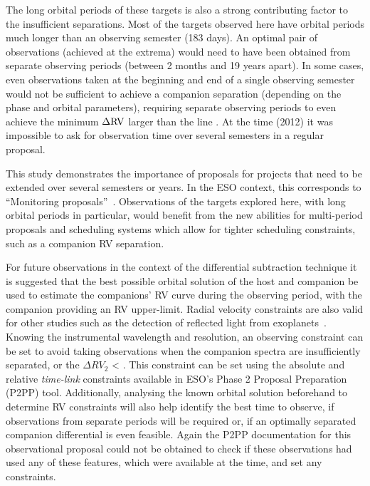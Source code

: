 The long orbital periods of these targets is also a strong contributing factor to the insufficient separations.
Most of the targets observed here have orbital periods much longer than an observing semester (183 days).
An optimal pair of observations (achieved at the extrema) would need to have been obtained from separate observing periods (between 2 months and 19 years apart).
In some cases, even observations taken at the beginning and end of a single observing semester would not be sufficient to achieve a companion separation (depending on the phase and orbital parameters), requiring separate observing periods to even achieve the minimum \(\Delta \rm {RV}\) larger than the line {\fwhm}.
At the time (2012) it was impossible to ask for observation time over several semesters in a regular proposal.

This study demonstrates the importance of proposals for projects that need to be extended over several semesters or years.
In the {ESO} context, this corresponds to ``Monitoring proposals''~\citep[e.g.][pg.~18]{eso_eso_2017}.
Observations of the targets explored here, with long orbital periods in particular, would benefit from the new abilities for multi-period proposals and scheduling systems which allow for tighter scheduling constraints, such as a companion {RV} separation.

For future observations in the context of the differential subtraction technique it is suggested that the best possible orbital solution of the host and companion be used to estimate the companions' {RV} curve during the observing period, with the companion \Mtwosini{} providing an {RV} upper-limit.
Radial velocity constraints are also valid for other studies such as the detection of reflected light from exoplanets~\cite[e.g.]{martins_evidence_2015}.
Knowing the instrumental wavelength and resolution, an observing constraint can be set to avoid taking observations when the companion spectra are insufficiently separated, or the \(\Delta {RV}_2\) < {\fwhm}.
This constraint can be set using the absolute and relative \emph{time-link} constraints available in {ESO}'s {Phase 2 Proposal Preparation} (P2PP) tool.
Additionally, analysing the known orbital solution beforehand to determine {RV} constraints will also help identify the best time to observe, if observations from separate periods will be required or, if an optimally separated companion differential is even feasible.
Again the {P2PP} documentation for this observational proposal could not be obtained to check if these observations had used any of these features, which were available at the time, and set any constraints.


